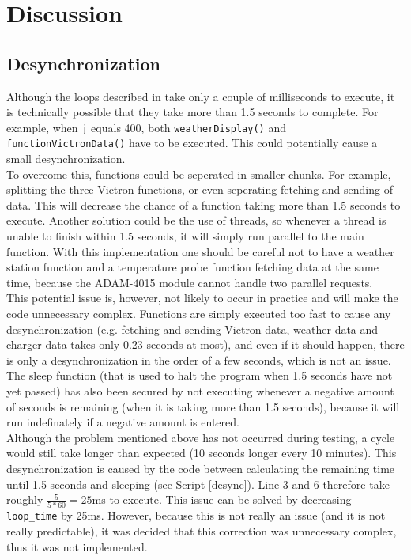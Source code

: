 \section{Discussion}\label{sec:discussion}
\subsection{Desynchronization}
Although the loops described in  take only a couple of milliseconds to execute, it is technically possible that they take more than 1.5 seconds to complete. For example, when \verb|j| equals 400, both \verb|weatherDisplay()| and \verb|functionVictronData()| have to be executed. This could potentially cause a small desynchronization.\\

To overcome this, functions could be seperated in smaller chunks. For example, splitting the three Victron functions, or even seperating fetching and sending of data. This will decrease the chance of a function taking more than 1.5 seconds to execute. Another solution could be the use of threads, so whenever a thread is unable to finish within 1.5 seconds, it will simply run parallel to the main function. With this implementation one should be careful not to have a weather station function and a temperature probe function fetching data at the same time, because the ADAM-4015 module cannot handle two parallel requests.\\

This potential issue is, however, not likely to occur in practice and will make the code unnecessary complex. Functions are simply executed too fast to cause any desynchronization (e.g. fetching and sending Victron data, weather data and charger data takes only 0.23 seconds at most), and even if it should happen, there is only a desynchronization in the order of a few seconds, which is not an issue. The sleep function (that is used to halt the program when 1.5 seconds have not yet passed) has also been secured by not executing whenever a negative amount of seconds is remaining (when it is taking more than 1.5 seconds), because it will run indefinately if a negative amount is entered.\\

Although the problem mentioned above has not occurred during testing, a cycle would still take longer than expected (10 seconds longer every 10 minutes). This desynchronization is caused by the code between calculating the remaining time until 1.5 seconds and sleeping (see Script \ref{desync}). Line 3 and 6 therefore take roughly $\frac{5}{5*60}=25$ms to execute. This issue can be solved by decreasing \verb|loop_time| by 25ms. However, because this is not really an issue (and it is not really predictable), it was decided that this correction was unnecessary complex, thus it was not implemented.

